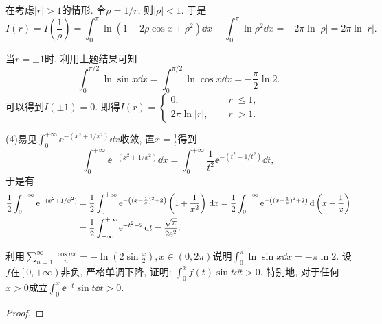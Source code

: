 \begin{quiza}
\begin{solution}
在考虑\(\left|r\right|>1\)的情形. 令\(\rho=1/r\), 则\(\left|\rho\right|<1\). 于是\[I(r)=I\left(\frac{1}{\rho}\right)=\int_{0}^{\pi}\ln\left(1-2\rho\cos x+\rho^2\right)\dd x-\int_{0}^{\pi}\ln \rho^2\dd x=-2\pi\ln\left|\rho\right|=2\pi\ln\left|r\right|.\]

当\(r=\pm 1\)时, 利用上题结果可知\[\int_{0}^{\pi/2}\ln\sin x\dd x=\int_{0}^{\pi/2}\ln\cos x\dd x=-\frac{\pi}{2}\ln 2.\]可以得到\(I(\pm 1)=0\). 即得\(I(r)=\begin{cases}
0,&|r|\leqslant 1,\\
2\pi\ln|r|,\quad&|r|>1.
\end{cases}\)

(4)易见\(\int_{0}^{+\infty}\ee^{-(x^2+1/x^2)}\dd x\)收敛, 置\(x=\frac{1}{t}\)得到\[\int_{0}^{+\infty}\ee^{-(x^2+1/x^2)}\dd x=\int_{0}^{+\infty}\frac{1}{t^2}\ee^{-(t^2+1/t^2)}\dd t,\]于是有\[\begin{split}
\frac{1}{2}\int_{0}^{+\infty}\mathrm{e}^{-(x^2+1/x^2)}&=\frac{1}{2}\int_{0}^{+\infty}\mathrm{e}^{-\left((x-\frac{1}{x})^2+2\right)}\left(1+\frac{1}{x^2}\right)\,\mathrm{d} x=\frac{1}{2}\int_{0}^{+\infty}\mathrm{e}^{-\left((x-\frac{1}{x})^2+2\right)}\,\mathrm{d}\left(x-\frac{1}{x}\right)\\&=\frac{1}{2}\int_{-\infty}^{+\infty}\mathrm{e}^{-t^2-2}\,\mathrm{d} t=\frac{\sqrt{\pi}}{2\mathrm{e}^2}.\qedhere
\end{split}\]
\end{solution}
\woe 利用\(\sum_{n=1}^{\infty}\frac{\cos nx}{n}=-\ln\left(2\sin\frac{x}{2}\right),x\in\left(0,2\pi\right)\)说明\(\int_{0}^{\pi}\ln\sin x\dd x=-\pi\ln 2.\)
\woe 设\(f\)在\(\left[0,+\infty\right)\)非负, 严格单调下降, 证明: \(\int_{0}^{x}f(t)\sin t\dd t>0\). 特别地, 对于任何\(x>0\)成立\(\int_{0}^{x}\ee^{-t}\sin t\dd t>0\).
\begin{proof}
	

\end{proof}
\end{quiza}
